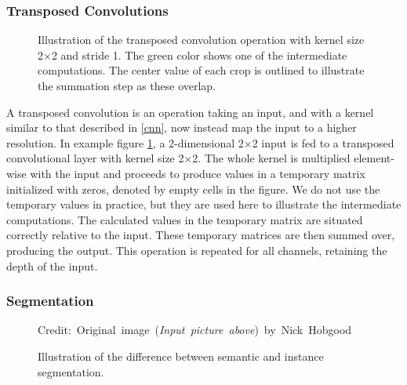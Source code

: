\subsubsection{Transposed Convolutions}
    \begin{figure}[H]
        \centering
        
        
        
        \caption[Transposed convolution]{Illustration of the transposed convolution operation with kernel size 2×2 and stride 1. The green color shows one of the intermediate computations. The center value of each crop is outlined to illustrate the summation step as these overlap.}
      	\medskip 
        \label{transposed_conv_fig}
    \end{figure}
    A transposed convolution is an operation taking an input, and with a kernel similar to that described in \ref{cnn}, now instead map the input to a higher resolution\cite{dumoulin2016guide_transposed_convolution}. In example figure \ref{transposed_conv_fig}, a 2-dimensional 2×2 input is fed to a transposed convolutional layer with kernel size 2×2. The whole kernel is multiplied element-wise with the input and proceeds to produce values in a temporary matrix initialized with zeros, denoted by empty cells in the figure. We do not use the temporary values in practice, but they are used here to illustrate the intermediate computations. The calculated values in the temporary matrix are situated correctly relative to the input. These temporary matrices are then summed over, producing the output. This operation is repeated for all channels, retaining the depth of the input. 
            


\subsubsection{Segmentation}
    \begin{figure}[H]
        \centering
        
        \caption[Difference between semantic and instance segmentation]{Illustration of the difference between semantic and instance segmentation.}
      	\medskip 
        \hspace*{15pt}\hbox{\scriptsize Credit: Original image (\textit{Input picture above}) by Nick Hobgood\cite{clownfish_image}}
        \label{segmentation_fig}
    \end{figure}

